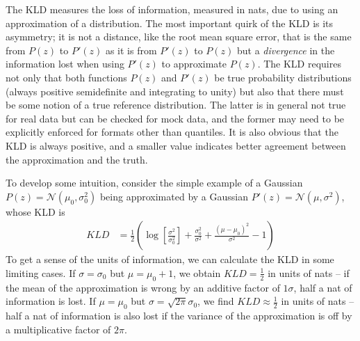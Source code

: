 \documentclass[\docopts]{\docclass}
\begin{document}
The KLD measures the loss of information, measured in nats, due to using an 
approximation of a distribution.  The most important quirk of the KLD is its 
asymmetry; it is not a distance, like the root mean square error, that is the 
same from $P(z)$ to $P'(z)$ as it is from $P'(z)$ to $P(z)$ but a 
\textit{divergence} in the information lost when using $P'(z)$ to approximate 
$P(z)$.  The KLD requires not only that both functions $P(z)$ and $P'(z)$ be 
true probability distributions (always positive semidefinite and integrating to 
unity) but also that there must be some notion of a true reference 
distribution.  The latter is in general not true for real data but can be 
checked for mock data, and the former may need to be explicitly enforced for 
formats other than quantiles.  It is also obvious that the KLD is always 
positive, and a smaller value indicates better agreement between the 
approximation and the truth.

To develop some intuition, consider the simple example of a Gaussian 
$P(z)=\mathcal{N}(\mu_{0}, \sigma_{0}^{2})$ being approximated by a Gaussian 
$P'(z)=\mathcal{N}(\mu, \sigma^{2})$, whose KLD is
\begin{align}
  \label{eq:gaussian}
  KLD &= \frac{1}{2}\left(\log\left[\frac{\sigma^{2}}{\sigma_{0}^{2}}\right] + 
\frac{\sigma_{0}^{2}}{\sigma^{2}} + \frac{(\mu-\mu_{0})^{2}}{\sigma^{2}} - 
1\right)
\end{align}
To get a sense of the units of information, we can calculate the KLD in some 
limiting cases.  If $\sigma=\sigma_{0}$ but $\mu=\mu_{0}+1$, we obtain 
$KLD=\frac{1}{2}$ in units of nats -- if the mean of the approximation is wrong 
by an additive factor of $1\sigma$, half a nat of information is lost.  If 
$\mu=\mu_{0}$ but $\sigma=\sqrt{2\pi}\sigma_{0}$, we find 
$KLD\approx\frac{1}{2}$ in units of nats -- half a nat of information is also 
lost if the variance of the approximation is off by a multiplicative factor of 
$2\pi$.
\end{document}
